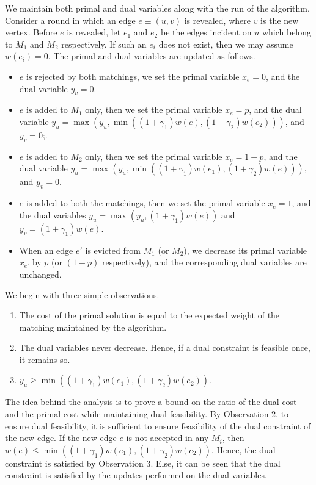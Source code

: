\documentclass[11pt]{article}
\begin{document}
We maintain both primal and dual variables along with the run of the algorithm. Consider a round in which an edge $e\equiv (u,v)$ is revealed, where $v$ is the new vertex. Before $e$ is revealed, let $e_1$ and $e_2$ be the edges incident on $u$ which belong to $M_1$ and $M_2$ respectively. If such an $e_i$ does not exist, then we may assume $w(e_i)=0$. The primal and dual variables are updated as follows.
\begin{itemize}
\item $e$ is rejected by both matchings, we set the primal variable $x_e=0$, and the dual variable $y_v=0$.
 \item $e$ is added to $M_1$ only, then we set the primal variable $x_e=p$, and the dual variable $y_u=\max(y_u,\min((1+\gamma_1) w(e), (1+\gamma_2) w(e_2)))$, and $y_v=0$;. 
 \item $e$ is added to $M_2$ only, then we set the primal variable $x_e=1-p$, and the dual variable $y_u=\max(y_u,\min((1+\gamma_1)w(e_1),(1+\gamma_2)w(e)))$, and $y_v=0$. 
 \item $e$ is added to both the matchings, then we set the primal variable $x_e=1$, and the dual variables $y_u=\max(y_u,(1+\gamma_1)w(e))$ and $y_v=(1+\gamma_1)w(e)$. 
 \item When an edge $e'$ is evicted from $M_1$ (or $M_2$), we decrease its primal variable $x_{e'}$ by $p$ (or $(1-p)$ respectively), and the corresponding dual variables are unchanged.
\end{itemize}
We begin with three simple observations.
\begin{enumerate}
 \item The cost of the primal solution is equal to the expected weight of the matching maintained by the algorithm.
 \item  The dual variables never decrease. Hence, if a dual constraint is feasible once, it remains so.
 \item $y_u \geq \min((1+\gamma_1)w(e_1),(1+\gamma_2)w(e_2))$.
\end{enumerate}
The idea behind the analysis is to prove a bound on the ratio of the dual cost and the primal cost while maintaining dual feasibility. By Observation $2$, to ensure dual feasibility, it is sufficient to ensure feasibility of the dual constraint of the new edge. If the new edge $e$ is not accepted in any $M_i$, then $w(e)\leq \min((1+\gamma_1)w(e_1),(1+\gamma_2)w(e_2))$. Hence, the dual constraint is satisfied by Observation $3$. Else, it can be seen that  the dual constraint is satisfied by the updates performed on the dual variables.
\end{document}
